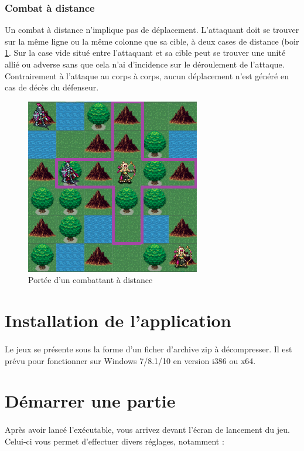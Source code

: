 \documentclass[a4paper]{article}
\begin{document}
\subsubsection{Combat à distance}
Un combat à distance n'implique pas de déplacement. L'attaquant doit se trouver sur la même ligne ou la même colonne que sa cible, à deux cases de distance (boir \ref{range}. Sur la case vide situé entre l'attaquant et sa cible peut se trouver une unité allié ou adverse sans que cela n'ai d'incidence sur le déroulement de l'attaque.
Contrairement à l'attaque au corps à corps, aucun déplacement n'est généré en cas de décès du défenseur.

\begin{figure}[h]
\begin{center}
\includegraphics[scale=0.7]{./img/range_arrow.png}
\caption{\label{range}Portée d'un combattant à distance}
\end{center}
\end{figure}

\newpage
\section{Installation de l'application}
\paragraph{}
Le jeux se présente sous la forme d'un ficher d'archive zip à décompresser. Il est prévu pour fonctionner sur Windows 7/8.1/10 en version i386 ou x64.

\section{Démarrer une partie}
\paragraph{}
Après avoir lancé l'exécutable, vous arrivez devant l'écran de lancement du jeu. Celui-ci vous permet d’effectuer divers réglages, notamment :
\end{document}
